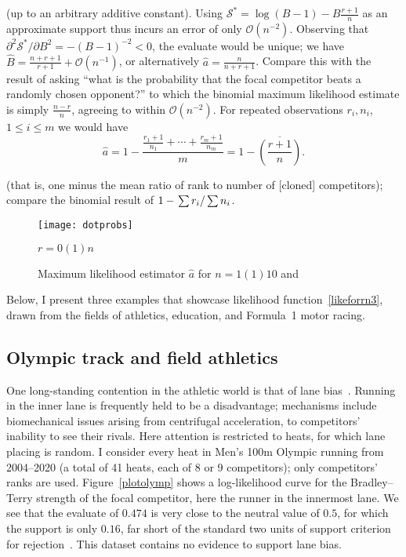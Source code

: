 \documentclass[article]{ajs}
\begin{document}
(up to an arbitrary additive constant).  Using
$\mathcal{S}^*=\log(B-1)-B\frac{r+1}{n}$ as an approximate
support thus incurs an error of only $\mathcal{O}(n^{-2})$.  Observing
that $\partial^2\mathcal{S}^*/\partial B^2=-(B-1)^{-2}<0$, the evaluate
would be unique; we have
$\hat{B}=\frac{n+r+1}{r+1}+\mathcal{O}\left(n^{-1}\right)$, or
alternatively $\hat{a}=\frac{n}{n+r+1}$.  Compare this with the result
of asking ``what is the probability that the focal competitor beats a
randomly chosen opponent?'' to which the binomial maximum likelihood
estimate is simply $\frac{n-r}{n}$, agreeing to within
$\mathcal{O}(n^{-2})$.  For repeated observations $r_i,n_i$,
$1\leqslant i\leqslant m$ we would have
\begin{equation}
  \hat{a} = 1-
  \frac{\frac{r_1+1}{n_1}+\cdots+\frac{r_m+1}{n_m}}{m}
  = 1-\overline{\left(\frac{r+1}{n}\right)}.
\end{equation}

(that is, one minus the mean ratio of rank to number of [cloned]
competitors); compare the binomial result of $1-\left.\sum
r_i\right/\sum n_i$.

\begin{figure}[t]
  \begin{centering}
\texttt{[image: dotprobs]}  %
\caption{Maximum likelihood estimator $\hat{a}$ for $n=1(1)10$
  and\label{dotprobs}} $r=0(1)n$
\end{centering}
\end{figure}

Below, I present three examples that showcase likelihood
function~\ref{likeforrn3}, drawn from the fields of athletics,
education, and Formula~1 motor racing.

\subsection{Olympic track and field athletics}

One long-standing contention in the athletic world is that of lane
bias~\citep{munro2022}.  Running in the inner lane is frequently held
to be a disadvantage; mechanisms include biomechanical issues arising
from centrifugal acceleration, to competitors' inability to see their
rivals.  Here attention is restricted to heats, for which lane placing
is random.  I consider every heat in Men's 100m Olympic running from
2004--2020 (a total of 41 heats, each of 8 or 9 competitors); only
competitors' ranks are used.  Figure~\ref{plotolymp} shows a
log-likelihood curve for the Bradley--Terry strength of the focal
competitor, here the runner in the innermost lane.  We see that the
evaluate of $0.474$ is very close to the neutral value of $0.5$, for
which the support is only $0.16$, far short of the standard two units
of support criterion for rejection~\citep{edwards1972}.  This dataset
contains no evidence to support lane bias.
\end{document}
